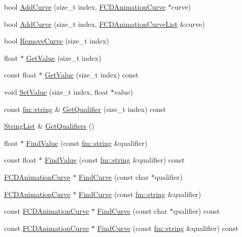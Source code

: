 \begin{DoxyCompactItemize}
\item 
bool \hyperlink{classFCDAnimated_aeb1a5d7190c09b8a52e8004d852d44d2}{AddCurve} (size\_\-t index, \hyperlink{classFCDAnimationCurve}{FCDAnimationCurve} $\ast$curve)
\item 
bool \hyperlink{classFCDAnimated_adf19a87cc5623a4cba67979673872e3b}{AddCurve} (size\_\-t index, \hyperlink{classfm_1_1pvector}{FCDAnimationCurveList} \&curve)
\item 
bool \hyperlink{classFCDAnimated_aca4a4bcb2f4a4e4300dd3a49a97d210b}{RemoveCurve} (size\_\-t index)
\item 
float $\ast$ \hyperlink{classFCDAnimated_ab28462e611ad8d67a601c75b74b323c5}{GetValue} (size\_\-t index)
\item 
const float $\ast$ \hyperlink{classFCDAnimated_a121b81d9b2f509c8b4c169d41173f4df}{GetValue} (size\_\-t index) const 
\item 
void \hyperlink{classFCDAnimated_a4ae4a3041789375550621b68c19cec0d}{SetValue} (size\_\-t index, float $\ast$value)
\item 
const \hyperlink{classfm_1_1stringT}{fm::string} \& \hyperlink{classFCDAnimated_a6f0e09b0549d25f1d244984a22f59ed8}{GetQualifier} (size\_\-t index) const 
\item 
\hyperlink{classfm_1_1vector}{StringList} \& \hyperlink{classFCDAnimated_a0cd874022861ee825398284c6a3e5dcd}{GetQualifiers} ()
\item 
float $\ast$ \hyperlink{classFCDAnimated_a4b77d83d7a9763e57150f53f3b47496f}{FindValue} (const \hyperlink{classfm_1_1stringT}{fm::string} \&qualifier)
\item 
const float $\ast$ \hyperlink{classFCDAnimated_a635f0277e3da5cbdf20751279a972f24}{FindValue} (const \hyperlink{classfm_1_1stringT}{fm::string} \&qualifier) const 
\item 
\hyperlink{classFCDAnimationCurve}{FCDAnimationCurve} $\ast$ \hyperlink{classFCDAnimated_a431e0ae388de3bacbd7c42499f9f1405}{FindCurve} (const char $\ast$qualifier)
\item 
\hyperlink{classFCDAnimationCurve}{FCDAnimationCurve} $\ast$ \hyperlink{classFCDAnimated_aab87b39e82d91a0cf2d6819339dee16e}{FindCurve} (const \hyperlink{classfm_1_1stringT}{fm::string} \&qualifier)
\item 
const \hyperlink{classFCDAnimationCurve}{FCDAnimationCurve} $\ast$ \hyperlink{classFCDAnimated_a7e54c3e4ef1375e0bd7911f8a6779967}{FindCurve} (const char $\ast$qualifier) const 
\item 
const \hyperlink{classFCDAnimationCurve}{FCDAnimationCurve} $\ast$ \hyperlink{classFCDAnimated_a9459a2c65b46053d887bc2e0aab16549}{FindCurve} (const \hyperlink{classfm_1_1stringT}{fm::string} \&qualifier) const 

\end{DoxyCompactItemize}
